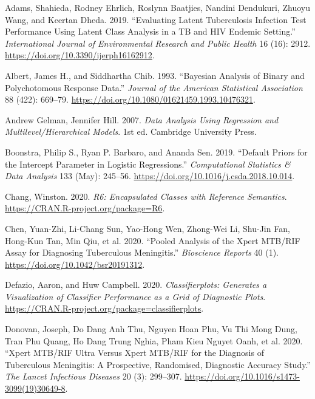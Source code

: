 \documentclass[
]{article}
\newlength{\cslhangindent}
\newlength{\cslentryspacingunit} %
\newenvironment{CSLReferences}[2] %
 {%
  \setlength{\parindent}{0pt}
  \ifodd #1
  \let\oldpar\par
  \def\par{\hangindent=\cslhangindent\oldpar}
  \fi
  \setlength{\parskip}{#2\cslentryspacingunit}
 }%
 {}
\begin{document}
\hypertarget{refs}{}
\begin{CSLReferences}{1}{0}
\leavevmode{}%
Adams, Shahieda, Rodney Ehrlich, Roslynn Baatjies, Nandini Dendukuri, Zhuoyu Wang, and Keertan Dheda. 2019. {``Evaluating Latent Tuberculosis Infection Test Performance Using Latent Class Analysis in a TB and HIV Endemic Setting.''} \emph{International Journal of Environmental Research and Public Health} 16 (16): 2912. \url{https://doi.org/10.3390/ijerph16162912}.

\leavevmode{}%
Albert, James H., and Siddhartha Chib. 1993. {``Bayesian Analysis of Binary and Polychotomous Response Data.''} \emph{Journal of the American Statistical Association} 88 (422): 669--79. \url{https://doi.org/10.1080/01621459.1993.10476321}.

\leavevmode{}%
Andrew Gelman, Jennifer Hill. 2007. \emph{Data Analysis Using Regression and Multilevel/Hierarchical Models}. 1st ed. Cambridge University Press.

\leavevmode{}%
Boonstra, Philip S., Ryan P. Barbaro, and Ananda Sen. 2019. {``Default Priors for the Intercept Parameter in Logistic Regressions.''} \emph{Computational Statistics \& Data Analysis} 133 (May): 245--56. \url{https://doi.org/10.1016/j.csda.2018.10.014}.

\leavevmode{}%
Chang, Winston. 2020. \emph{R6: Encapsulated Classes with Reference Semantics}. \url{https://CRAN.R-project.org/package=R6}.

\leavevmode{}%
Chen, Yuan-Zhi, Li-Chang Sun, Yao-Hong Wen, Zhong-Wei Li, Shu-Jin Fan, Hong-Kun Tan, Min Qiu, et al. 2020. {``Pooled Analysis of the Xpert MTB/RIF Assay for Diagnosing Tuberculous Meningitis.''} \emph{Bioscience Reports} 40 (1). \url{https://doi.org/10.1042/bsr20191312}.

\leavevmode{}%
Defazio, Aaron, and Huw Campbell. 2020. \emph{Classifierplots: Generates a Visualization of Classifier Performance as a Grid of Diagnostic Plots}. \url{https://CRAN.R-project.org/package=classifierplots}.

\leavevmode{}%
Donovan, Joseph, Do Dang Anh Thu, Nguyen Hoan Phu, Vu Thi Mong Dung, Tran Phu Quang, Ho Dang Trung Nghia, Pham Kieu Nguyet Oanh, et al. 2020. {``Xpert MTB/RIF Ultra Versus Xpert MTB/RIF for the Diagnosis of Tuberculous Meningitis: A Prospective, Randomised, Diagnostic Accuracy Study.''} \emph{The Lancet Infectious Diseases} 20 (3): 299--307. \url{https://doi.org/10.1016/s1473-3099(19)30649-8}.


\end{CSLReferences}
\end{document}
